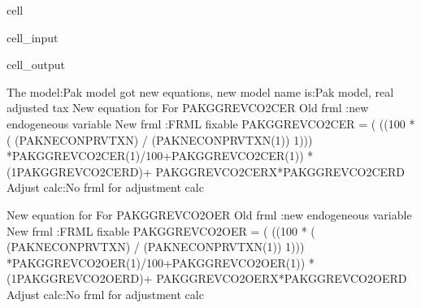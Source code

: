 \documentclass[letterpaper,10pt,english]{jupyterBook}
\begin{document}
\begin{sphinxuseclass}{cell}\begin{sphinxVerbatimInput}

\begin{sphinxuseclass}{cell_input}
\begin{sphinxVerbatim}[commandchars=\\\{\}]
  
 
\end{sphinxVerbatim}

\end{sphinxuseclass}\end{sphinxVerbatimInput}
\begin{sphinxVerbatimOutput}

\begin{sphinxuseclass}{cell_output}
\begin{sphinxVerbatim}[commandchars=\\\{\}]
The model:\PYGZdq{}Pak model\PYGZdq{} got new equations, new model name is:\PYGZdq{}Pak model, real adjusted tax\PYGZdq{}
New equation for For PAKGGREVCO2CER
Old frml   :new endogeneous variable 
New frml   :FRML \PYGZlt{}fixable\PYGZgt{} PAKGGREVCO2CER = ( ((100 * ( (PAKNECONPRVTXN) / (PAKNECONPRVTXN(\PYGZhy{}1)) \PYGZhy{}1))) *PAKGGREVCO2CER(\PYGZhy{}1)/100+PAKGGREVCO2CER(\PYGZhy{}1)) * (1\PYGZhy{}PAKGGREVCO2CER\PYGZus{}D)+ PAKGGREVCO2CER\PYGZus{}X*PAKGGREVCO2CER\PYGZus{}D \PYGZdl{}
Adjust calc:No frml for adjustment calc  

New equation for For PAKGGREVCO2OER
Old frml   :new endogeneous variable 
New frml   :FRML \PYGZlt{}fixable\PYGZgt{} PAKGGREVCO2OER = ( ((100 * ( (PAKNECONPRVTXN) / (PAKNECONPRVTXN(\PYGZhy{}1)) \PYGZhy{}1))) *PAKGGREVCO2OER(\PYGZhy{}1)/100+PAKGGREVCO2OER(\PYGZhy{}1)) * (1\PYGZhy{}PAKGGREVCO2OER\PYGZus{}D)+ PAKGGREVCO2OER\PYGZus{}X*PAKGGREVCO2OER\PYGZus{}D \PYGZdl{}
Adjust calc:No frml for adjustment calc  


\end{sphinxVerbatim}
\end{sphinxuseclass}
\end{sphinxVerbatimOutput}
\end{sphinxuseclass}
\end{document}
